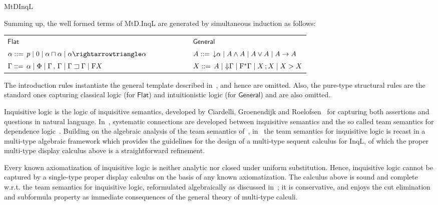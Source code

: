 \begin{entry}{MtDInqL}
\begin{clarifications}
  Summing up, the well formed terms of MtD.InqL are generated by simultaneous
  induction as follows:
  \begin{center}
  \setlength{\tabcolsep}{0.4em}
  \begin{tabular}{lcl}
  $\mathsf{Flat}$ & \ \ \ \ \ \ \ \ \ & $\mathsf{General}$\\
  $\alpha ::= \,p \mid 0 \mid \alpha \cand \alpha \mid \alpha \cra \alpha$ & 
    & $A ::= \,{\downarrow} \alpha \mid A \wedge A \mid A \vee A \mid A \to A$ \\
  $\Gamma ::= \,\alpha \mid \Phi \mid \Gamma \,,\, \Gamma \mid \Gamma \sqsupset \Gamma\mid \mathrm{F} X$ & 
    & $X ::= \,A\mid{\Downarrow} \Gamma\mid \mathrm{F}^*\Gamma \mid X \,; X \mid X > X$ \\
  \end{tabular}
  \end{center}
  
  The introduction rules instantiate the general template described
  in~, and hence are omitted. Also, the pure-type structural rules are the
  standard ones capturing classical logic (for $\mathsf{Flat}$) and intuitionistic
  logic (for $\mathsf{General}$) and are also omitted. 
\end{clarifications}


\begin{history}
  Inquisitive logic is the logic of inquisitive semantics, developed by Ciardelli,
  Groenendijk and Roelofsen~\cite{GroenendijkRoelofsen2009,CiardelliRoelofsen2011}
  for capturing both assertions and questions in natural language.
  In~\cite{Yang2014}, systematic connections are developed between inquisitive
  semantics and the so called team semantics for dependence
  logic~\cite{AbramskyVaananen2009}. Building on the algebraic analysis of the
  team semantics of~\cite{AbramskyVaananen2009},
  in~\cite{FrittellaGrecoPalmigianoYang2016}  the team semantics for inquisitive
  logic is recast in a multi-type algebraic framework which provides the
  guidelines for the design of a multi-type sequent calculus for InqL, of which
  the proper multi-type display calculus  above is a straightforward refinement.
\end{history}

\begin{technicalities}
  Every known axiomatization of inquisitive logic is neither analytic nor closed
  under uniform substitution. Hence, inquisitive logic cannot be captured by a
  single-type proper display calculus on the basis of any known axiomatization.
  The calculus above is sound and complete w.r.t. the team semantics for
  inquisitive logic, reformulated algebraically as discussed
  in~\cite{FrittellaGrecoPalmigianoYang2016}; it is conservative, and enjoys the
  cut elimination and subformula property as immediate consequences of the general
  theory of multi-type calculi.
\end{technicalities}

\end{entry}
